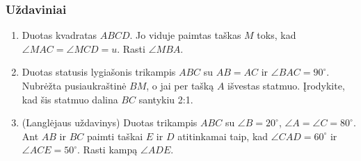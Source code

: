 \subsubsection{Uždaviniai}
\begin{enumerate}
\item Duotas kvadratas $ABCD$. Jo viduje paimtas taškas $M$
  toks, kad $\angle MAC=\angle MCD=u$. Rasti $\angle MBA$. 
\item Duotas statusis lygiašonis trikampis $ABC$ su $AB=AC$
  ir $\angle BAC=90^\circ$. Nubrėžta pusiaukraštinė $BM$, o
  jai per tašką $A$ išvestas statmuo. Įrodykite, kad šis
  statmuo dalina $BC$ santykiu 2:1.
\item (Langlėjaus uždavinys) Duotas trikampis $ABC$ su
  $\angle B=20^\circ$, $\angle A=\angle C=80^\circ$. Ant
  $AB$ ir $BC$ paimti taškai $E$ ir $D$ atitinkamai taip,
  kad $\angle CAD=60^\circ$ ir $\angle ACE=50^\circ$. Rasti
  kampą $\angle ADE$.

\end{enumerate}
